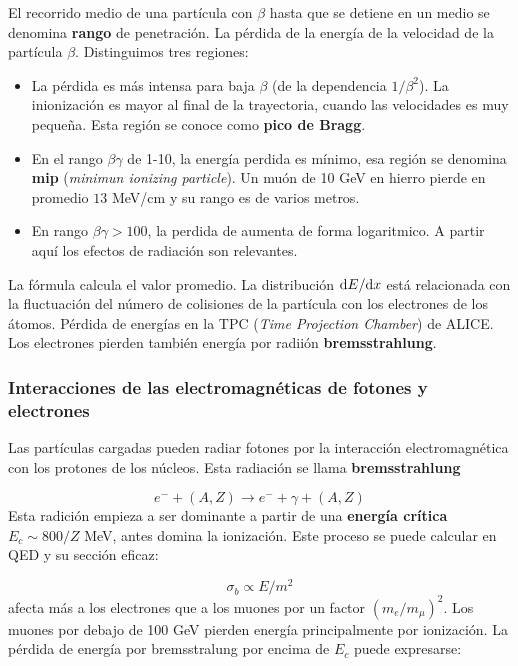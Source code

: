 El recorrido medio de una partícula con $\beta$ hasta que se detiene en un medio se denomina \textbf{rango} de penetración. La pérdida de la energía de la velocidad de la partícula $\beta$. Distinguimos tres regiones:

\begin{itemize}
	\item La pérdida es más intensa para baja $\beta$ (de la dependencia $1/\beta^2$). La inionización es mayor al final de la trayectoria, cuando las velocidades es muy pequeña. Esta región se conoce como \textbf{pico de Bragg}.
	\item En el rango $\beta \gamma$ de 1-10, la energía perdida es mínimo, esa región se denomina \textbf{mip} (\textit{minimun ionizing particle}). Un muón de 10 GeV en hierro pierde en promedio $13$ MeV/cm y su rango es de varios metros. 
	\item En rango $\beta \gamma>100$, la perdida de aumenta de forma logaritmico. A partir aquí los efectos de radiación son relevantes.
\end{itemize}
La fórmula calcula el valor promedio. La distribución $\mathrm{d} E / \mathrm{d} x$ está relacionada con la fluctuación del número de colisiones de la partícula con los electrones de los átomos. Pérdida de energías en la TPC (\textit{Time Projection Chamber}) de ALICE. Los electrones pierden también energía por radiión \textbf{bremsstrahlung}.

\subsubsection{Interacciones de las electromagnéticas de fotones y electrones}

Las partículas cargadas pueden radiar fotones por la interacción electromagnética con los protones de los núcleos. Esta radiación se llama \textbf{bremsstrahlung}

\begin{equation}
	e^- + (A,Z) \rightarrow e^- + \gamma + (A,Z)
\end{equation}
Esta radición empieza a ser dominante a partir de una \textbf{energía crítica} $E_c \sim 800 /Z$ MeV, antes domina la ionización. Este proceso se puede calcular en QED y su sección eficaz:

\begin{equation}
	\sigma_b  \propto E/m^2 
\end{equation}
afecta más a los electrones que a los muones por un factor $(m_e/m_\mu)^2$. Los muones por debajo de 100 GeV pierden energía principalmente por ionización. La pérdida de energía por bremsstralung por encima de $E_c$ puede expresarse:


